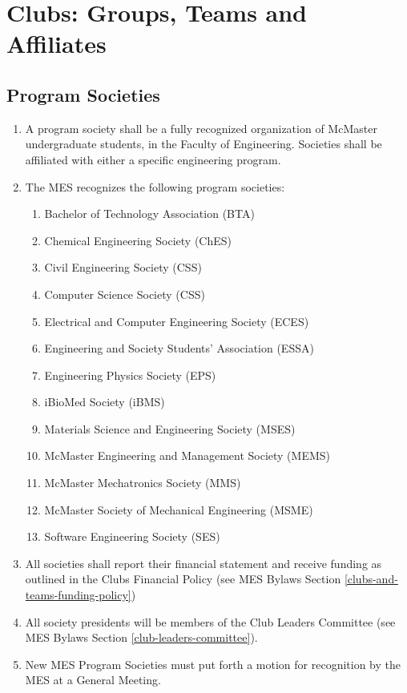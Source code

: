 \section{Clubs: Groups, Teams and Affiliates}
\label{clubs-groups-teams-and-affiliates}

\subsection{Program Societies}
\label{program-societies}
\begin{enumerate}
 \item
  A program society shall be a fully recognized organization of McMaster undergraduate students, in the Faculty of Engineering. Societies shall be affiliated with either a specific engineering program.
 \item
  The MES recognizes the following program societies:

  \begin{enumerate}
   \item
    Bachelor of Technology Association (BTA)
   \item
    Chemical Engineering Society (ChES)
   \item
    Civil Engineering Society (CSS)
   \item
    Computer Science Society (CSS)
   \item
    Electrical and Computer Engineering Society (ECES)
   \item
    Engineering and Society Students' Association (ESSA)
   \item
    Engineering Physics Society (EPS)
   \item
    iBioMed Society (iBMS)
   \item
    Materials Science and Engineering Society (MSES)
   \item
    McMaster Engineering and Management Society (MEMS)
   \item
    McMaster Mechatronics Society (MMS)
   \item
    McMaster Society of Mechanical Engineering (MSME)
   \item
    Software Engineering Society (SES)
  \end{enumerate}
 \item
  All societies shall report their financial statement and receive funding as outlined in the Clubs Financial Policy (see MES Bylaws Section \ref{clubs-and-teams-funding-policy})
 \item
  All society presidents will be members of the Club Leaders Committee (see MES Bylaws Section \ref{club-leaders-committee}).
 \item
  New MES Program Societies must put forth a motion for recognition by the MES at a General Meeting.

\end{enumerate}

